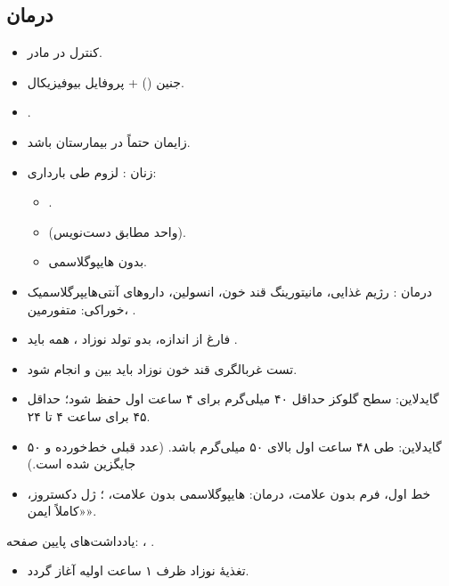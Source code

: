 \documentclass[12pt,a4paper]{article}
\begin{document}
\subsection*{درمان}
\begin{itemize}
\item کنترل  در مادر.
\item {} جنین () + پروفایل بیوفیزیکال.
\item {}.
\item زایمان حتماً در بیمارستان باشد.
\item زنان : لزوم  طی بارداری:
  \begin{itemize}
  \item {}.
  \item {}  (واحد مطابق دست‌نویس).
  \item بدون هایپوگلاسمی.
  \end{itemize}
\item درمان : رژیم غذایی، مانیتورینگ قند خون، انسولین، داروهای آنتی‌هایپرگلاسمیک خوراکی: متفورمین، .
\item فارغ از اندازه، بدو تولد نوزاد ، همه باید .
\item تست غربالگری قند خون نوزاد باید بین  و  انجام شود.
\item {} گایدلاین: سطح گلوکز حداقل ۴۰ میلی‌گرم برای ۴ ساعت اول حفظ شود؛ حداقل ۴۵ برای ساعت ۴ تا ۲۴.
\item {} گایدلاین: طی ۴۸ ساعت اول بالای ۵۰ میلی‌گرم باشد. (عدد قبلی خط‌خورده و ۵۰ جایگزین شده است.)
\item خط اول، فرم بدون علامت، درمان: هایپوگلاسمی بدون علامت، ؛ ژل دکستروز، «کاملاً ایمن».
\end{itemize}
{\footnotesize یادداشت‌های پایین صفحه: ، .\par}

\clearpage
{}
\begin{itemize}
\item تغذیهٔ نوزاد ظرف ۱ ساعت اولیه آغاز گردد.
\end{itemize}
\end{document}
